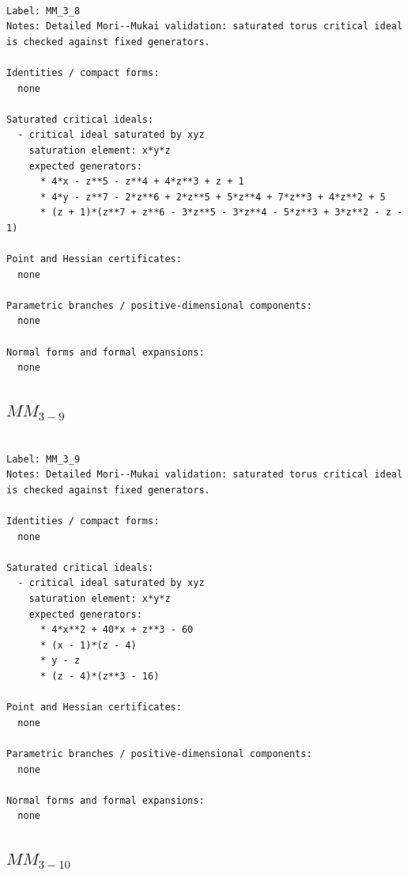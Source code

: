 \documentclass[10pt,a4paper]{article}
\begin{document}
\begin{lstlisting}

Label: MM_3_8
Notes: Detailed Mori--Mukai validation: saturated torus critical ideal is checked against fixed generators.

Identities / compact forms:
  none

Saturated critical ideals:
  - critical ideal saturated by xyz
    saturation element: x*y*z
    expected generators:
      * 4*x - z**5 - z**4 + 4*z**3 + z + 1
      * 4*y - z**7 - 2*z**6 + 2*z**5 + 5*z**4 + 7*z**3 + 4*z**2 + 5
      * (z + 1)*(z**7 + z**6 - 3*z**5 - 3*z**4 - 5*z**3 + 3*z**2 - z - 1)

Point and Hessian certificates:
  none

Parametric branches / positive-dimensional components:
  none

Normal forms and formal expansions:
  none

\end{lstlisting}

\subsection*{$ MM_{3-9} $}

\begin{lstlisting}

Label: MM_3_9
Notes: Detailed Mori--Mukai validation: saturated torus critical ideal is checked against fixed generators.

Identities / compact forms:
  none

Saturated critical ideals:
  - critical ideal saturated by xyz
    saturation element: x*y*z
    expected generators:
      * 4*x**2 + 40*x + z**3 - 60
      * (x - 1)*(z - 4)
      * y - z
      * (z - 4)*(z**3 - 16)

Point and Hessian certificates:
  none

Parametric branches / positive-dimensional components:
  none

Normal forms and formal expansions:
  none

\end{lstlisting}

\subsection*{$ MM_{3-10} $}
\end{document}
